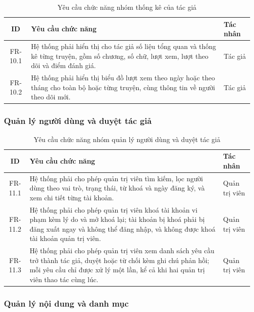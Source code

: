 \begin{table}[H]
\centering
\renewcommand{\arraystretch}{1.3}
\begin{tabularx}{\textwidth}{|c|X|p{3cm}|}
\hline
\textbf{ID} & \textbf{Yêu cầu chức năng} & \textbf{Tác nhân} \\ \hline
FR-10.1 & Hệ thống phải hiển thị cho tác giả số liệu tổng quan và thống kê từng truyện, gồm số chương, số chữ, lượt xem, lượt theo dõi và điểm đánh giá. & Tác giả \\ \hline
FR-10.2 & Hệ thống phải hiển thị biểu đồ lượt xem theo ngày hoặc theo tháng cho toàn bộ hoặc từng truyện, cùng thông tin về người theo dõi mới. & Tác giả \\ \hline
\end{tabularx}
\caption{Yêu cầu chức năng nhóm thống kê của tác giả}
\label{tab:fr-author-stats}
\end{table}

\subsubsection{Quản lý người dùng và duyệt tác giả}

\begin{table}[H]
\centering
\renewcommand{\arraystretch}{1.3}
\begin{tabularx}{\textwidth}{|c|X|p{3cm}|}
\hline
\textbf{ID} & \textbf{Yêu cầu chức năng} & \textbf{Tác nhân} \\ \hline
FR-11.1 & Hệ thống phải cho phép quản trị viên tìm kiếm, lọc người dùng theo vai trò, trạng thái, từ khoá và ngày đăng ký, và xem chi tiết từng tài khoản. & Quản trị viên \\ \hline
FR-11.2 & Hệ thống phải cho phép quản trị viên khoá tài khoản vi phạm kèm lý do và mở khoá lại; tài khoản bị khoá phải bị đăng xuất ngay và không thể đăng nhập, và không được khoá tài khoản quản trị viên. & Quản trị viên \\ \hline
FR-11.3 & Hệ thống phải cho phép quản trị viên xem danh sách yêu cầu trở thành tác giả, duyệt hoặc từ chối kèm ghi chú phản hồi; mỗi yêu cầu chỉ được xử lý một lần, kể cả khi hai quản trị viên thao tác cùng lúc. & Quản trị viên \\ \hline
\end{tabularx}
\caption{Yêu cầu chức năng nhóm quản lý người dùng và duyệt tác giả}
\label{tab:fr-admin-users}
\end{table}

\subsubsection{Quản lý nội dung và danh mục}

